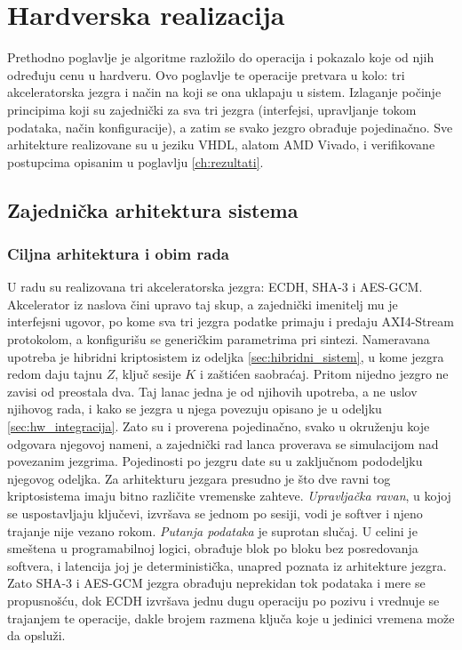 \chapter{Hardverska realizacija}
\label{ch:hardver}


Prethodno poglavlje je algoritme razložilo do operacija i pokazalo koje od njih određuju cenu u hardveru. Ovo poglavlje te operacije pretvara u kolo: tri akceleratorska jezgra i način na koji se ona uklapaju u sistem. Izlaganje počinje principima koji su zajednički za sva tri jezgra (interfejsi, upravljanje tokom podataka, način konfiguracije), a zatim se svako jezgro obrađuje pojedinačno. Sve arhitekture realizovane su u jeziku VHDL, alatom AMD Vivado, i verifikovane postupcima opisanim u poglavlju \ref{ch:rezultati}.

\section{Zajednička arhitektura sistema}
\label{sec:hw_sistem}

\subsection{Ciljna arhitektura i obim rada}
\label{subsec:hw_cilj}

U radu su realizovana tri akceleratorska jezgra: ECDH, SHA-3 i AES-GCM. Akcelerator iz naslova čini upravo taj skup, a zajednički imenitelj mu je interfejsni ugovor, po kome sva tri jezgra podatke primaju i predaju AXI4-Stream protokolom, a konfigurišu se generičkim parametrima pri sintezi. Nameravana upotreba je hibridni kriptosistem iz odeljka \ref{sec:hibridni_sistem}, u kome jezgra redom daju tajnu $Z$, ključ sesije $K$ i zaštićen saobraćaj.
\smallbreak
Pritom nijedno jezgro ne zavisi od preostala dva. Taj lanac jedna je od njihovih upotreba, a ne uslov njihovog rada, i kako se jezgra u njega povezuju opisano je u odeljku \ref{sec:hw_integracija}. Zato su i proverena pojedinačno, svako u okruženju koje odgovara njegovoj nameni, a zajednički rad lanca proverava se simulacijom nad povezanim jezgrima. Pojedinosti po jezgru date su u zaključnom pododeljku njegovog odeljka.
\smallbreak
Za arhitekturu jezgara presudno je što dve ravni tog kriptosistema imaju bitno različite vremenske zahteve. \textit{Upravljačka ravan}, u kojoj se uspostavljaju ključevi, izvršava se jednom po sesiji, vodi je softver i njeno trajanje nije vezano rokom. \textit{Putanja podataka} je suprotan slučaj. U celini je smeštena u programabilnoj logici, obrađuje blok po bloku bez posredovanja softvera, i latencija joj je deterministička, unapred poznata iz arhitekture jezgra. Zato SHA-3 i AES-GCM jezgra obrađuju neprekidan tok podataka i mere se propusnošću, dok ECDH izvršava jednu dugu operaciju po pozivu i vrednuje se trajanjem te operacije, dakle brojem razmena ključa koje u jedinici vremena može da opsluži.

